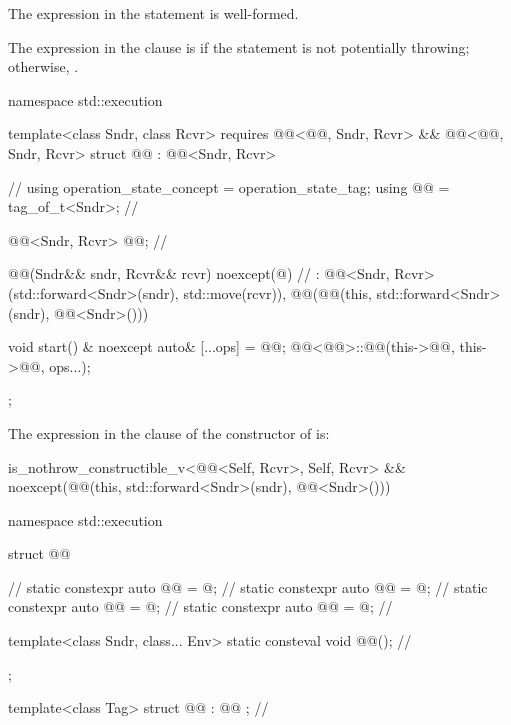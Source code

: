 \begin{itemdescr}
\pnum
\constraints
The expression in the  statement is well-formed.

\pnum
\remarks
The expression in the  clause is 
if the  statement is not potentially throwing;
otherwise, .
\end{itemdescr}

\pnum
\begin{codeblock}
namespace std::execution {
  template<class Sndr, class Rcvr>
    requires @@<@@, Sndr, Rcvr> &&
             @@<@@, Sndr, Rcvr>
  struct @@ : @@<Sndr, Rcvr> {            // \expos
    using operation_state_concept = operation_state_tag;
    using @@ = tag_of_t<Sndr>;                               // \expos

    @@<Sndr, Rcvr> @@;                   // \expos

    @@(Sndr&& sndr, Rcvr&& rcvr) noexcept(@\seebelownc@)               // \expos
      : @@<Sndr, Rcvr>(std::forward<Sndr>(sndr), std::move(rcvr)),
        @@(@@(this, std::forward<Sndr>(sndr), @@<Sndr>()))
    {}

    void start() & noexcept {
      auto& [...ops] = @@;
      @@<@@>::@@(this->@@, this->@@, ops...);
    }
  };
}
\end{codeblock}

\pnum
The expression in the  clause of
the constructor of  is:
\begin{codeblock}
is_nothrow_constructible_v<@@<Self, Rcvr>, Self, Rcvr> &&
noexcept(@@(this, std::forward<Sndr>(sndr), @@<Sndr>()))
\end{codeblock}

\pnum
\begin{codeblock}
namespace std::execution {
  struct @@ {                                        // \expos
    static constexpr auto @@ = @\seebelownc@;                  // \expos
    static constexpr auto @@ = @\seebelownc@;                // \expos
    static constexpr auto @@ = @\seebelownc@;                    // \expos
    static constexpr auto @@ = @\seebelownc@;                 // \expos

    template<class Sndr, class... Env>
      static consteval void @@();                      // \expos
  };

  template<class Tag>
  struct @@ : @@ {};                          // \expos
}
\end{codeblock}

